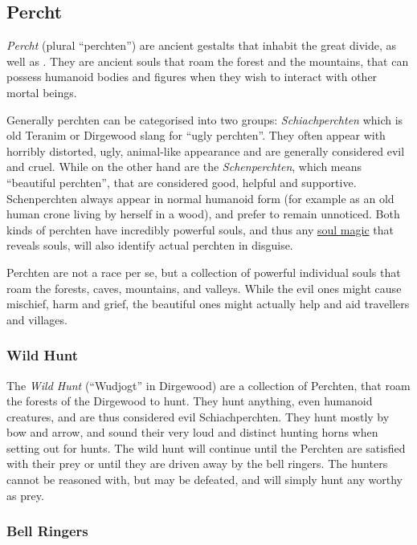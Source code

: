 \subsection{Percht}
\label{sec:Percht}

\emph{Percht} (plural ``perchten'') are ancient gestalts that inhabit the
great divide, as well as . They are ancient souls that
roam the forest and the mountains, that can possess humanoid bodies and
figures when they wish to interact with other mortal beings.

Generally perchten can be categorised into two groups: \emph{Schiachperchten}
which is old Teranim or Dirgewood slang for ``ugly perchten''. They often
appear with horribly distorted, ugly, animal-like appearance and are generally
considered evil and cruel. While on the other hand are the \emph{Schenperchten},
which means ``beautiful perchten'', that are considered good, helpful and
supportive. Schenperchten always appear in normal humanoid form (for example as
an old human crone living by herself in a wood), and prefer to remain
unnoticed.  Both kinds of perchten have incredibly powerful souls, and thus
any \hyperref[sec:Soul Magic]{soul magic} that reveals souls, will also
identify actual perchten in disguise.

Perchten are not a race per se, but a collection of powerful individual souls
that roam the forests, caves, mountains, and valleys. While the evil ones might
cause mischief, harm and grief, the beautiful ones might actually help and aid
travellers and villages.

\subsubsection{Wild Hunt}
\label{sec:Wild Hunt}

The \emph{Wild Hunt} (``Wudjogt'' in Dirgewood) are a collection of Perchten,
that roam the forests of the Dirgewood to hunt. They hunt anything, even
humanoid creatures, and are thus considered evil Schiachperchten. They hunt
mostly by bow and arrow, and sound their very loud and distinct hunting horns
when setting out for hunts. The wild hunt will continue until the Perchten are
satisfied with their prey or until they are driven away by the bell ringers.
The hunters cannot be reasoned with, but may be defeated, and will simply hunt
any worthy as prey.

\subsubsection{Bell Ringers}
\label{sec:Bell Ringers}

